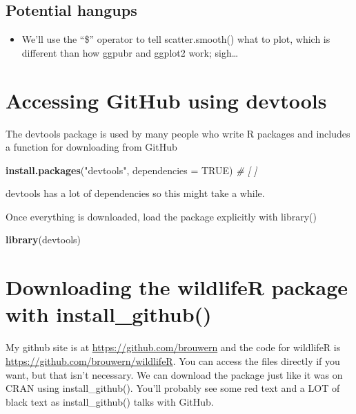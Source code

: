 \documentclass[]{book}
\newenvironment{Shaded}{\begin{snugshade}}{\end{snugshade}}
\newcommand{\KeywordTok}[1]{\textcolor[rgb]{0.13,0.29,0.53}{\textbf{#1}}}
\newcommand{\DataTypeTok}[1]{\textcolor[rgb]{0.13,0.29,0.53}{#1}}
\newcommand{\StringTok}[1]{\textcolor[rgb]{0.31,0.60,0.02}{#1}}
\newcommand{\CommentTok}[1]{\textcolor[rgb]{0.56,0.35,0.01}{\textit{#1}}}
\newcommand{\OtherTok}[1]{\textcolor[rgb]{0.56,0.35,0.01}{#1}}
\newcommand{\NormalTok}[1]{#1}
\providecommand{\tightlist}{%
  \setlength{\itemsep}{0pt}\setlength{\parskip}{0pt}}
\theoremstyle{definition}
\theoremstyle{definition}
\theoremstyle{definition}
\theoremstyle{remark}
\begin{document}
\subsection{Potential hangups}\label{potential-hangups-1}

\begin{itemize}
\tightlist
\item
  We'll use the ``\$'' operator to tell scatter.smooth() what to plot,
  which is different than how ggpubr and ggplot2 work; sigh\ldots{}
\end{itemize}

\section{\texorpdfstring{\protect\hyperlink{section-3}{} Accessing
GitHub using
devtools}{ Accessing GitHub using devtools}}\label{accessing-github-using-devtools}

The devtools package is used by many people who write R packages and
includes a function for downloading from GitHub

\begin{Shaded}
\begin{Highlighting}[]
\KeywordTok{install.packages}\NormalTok{(}\StringTok{"devtools"}\NormalTok{, }\DataTypeTok{dependencies =} \OtherTok{TRUE}\NormalTok{) }\CommentTok{# [ ]}
\end{Highlighting}
\end{Shaded}

devtools has a lot of dependencies so this might take a while.

Once everything is downloaded, load the package explicitly with
library()

\begin{Shaded}
\begin{Highlighting}[]
\KeywordTok{library}\NormalTok{(devtools)}
\end{Highlighting}
\end{Shaded}

\section{\texorpdfstring{\protect\hyperlink{section-3}{} Downloading the
wildlifeR package with
install\_github()}{ Downloading the wildlifeR package with install\_github()}}\label{downloading-the-wildlifer-package-with-install_github}

My github site is at \url{https://github.com/brouwern} and the code for
wildlifeR is \url{https://github.com/brouwern/wildlifeR}. You can access
the files directly if you want, but that isn't necessary. We can
download the package just like it was on CRAN using install\_github().
You'll probably see some red text and a LOT of black text as
install\_github() talks with GitHub.
\end{document}
